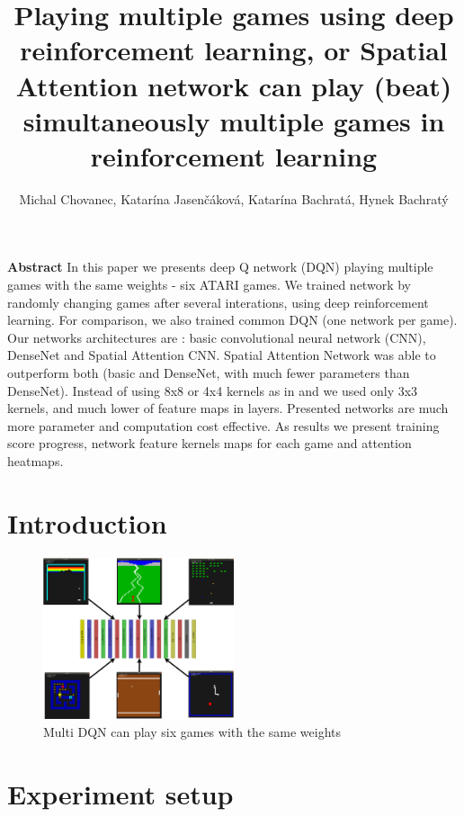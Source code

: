 \documentclass[10pt,a4paper]{article}
\begin{document}
\title{Playing multiple games using deep reinforcement learning, or Spatial Attention network can play (beat) simultaneously multiple games in reinforcement learning}
\author{Michal Chovanec, Katarína Jasenčáková, Katarína Bachratá, Hynek Bachratý}
\date{}
\maketitle
\thispagestyle{empty}

{\bf Abstract}
In this paper we presents deep Q network (DQN) playing multiple games with the same weights - six ATARI games.
We trained network by randomly changing games after several interations, using deep reinforcement learning.
For comparison, we also trained common DQN (one network per game). Our networks architectures are : basic convolutional neural network (CNN), DenseNet and Spatial Attention CNN.
Spatial Attention Network was able to outperform both (basic and DenseNet, with much fewer parameters than DenseNet).
Instead of using 8x8 or 4x4 kernels as in \cite{bib:dqn_atari} and \cite{bib:dqn_doom}  we used only 3x3 kernels, and much lower of feature maps in layers.
Presented networks are much more parameter and computation cost effective. As results we present training score progress, network feature kernels maps for each game and attention heatmaps.


\section{Introduction}


\begin{figure}[htb!]
\centering
\includegraphics[width=0.5\textwidth]{diagrams/multi_dqn.png}
\caption{Multi DQN can play six games with the same weights}

\end{figure}

\newpage
\section{Experiment setup}
\end{document}

